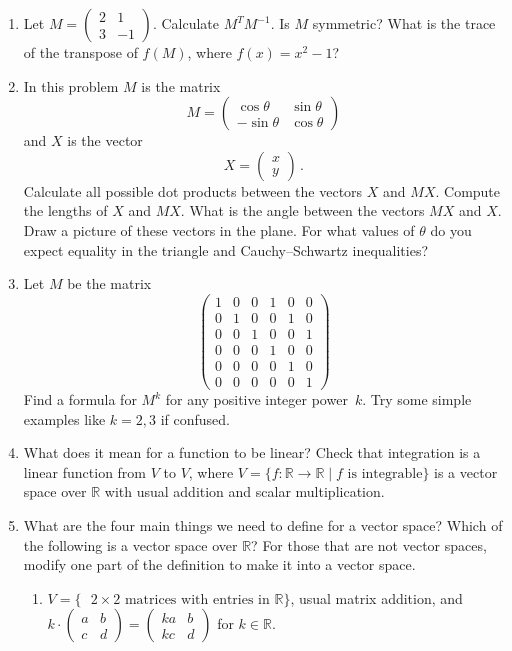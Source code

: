 \begin{enumerate}
\item Let $M = \left ( \begin{array}{cc} 2 & 1 \\ 3 & -1 \end{array}  \right )$.  Calculate $M^TM^{-1}$.  Is $M$ symmetric?  What is the trace of the transpose of $f(M)$, where $f(x) = x^2 -1$?

\item In this problem $M$ is the matrix
$$
M=\begin{pmatrix}\cos\theta & \sin\theta \\ -\sin\theta&\cos\theta\end{pmatrix}
$$
and $X$ is the vector
$$
X=\begin{pmatrix}x\\y \end{pmatrix}\, .
$$
Calculate all possible dot products between the vectors $X$ and $MX$. Compute the lengths of $X$ and $MX$.
What is the angle between the vectors $MX$ and $X$. Draw a picture of these vectors in the plane. For what values
of $\theta$ do you expect equality in the triangle and Cauchy--Schwartz inequalities?

\item Let $M$ be the matrix
$$
\begin{pmatrix}
1&0&0&1&0&0\\
0&1&0&0&1&0\\
0&0&1&0&0&1\\
0&0&0&1&0&0\\
0&0&0&0&1&0\\
0&0&0&0&0&1
\end{pmatrix}
$$
Find a formula for $M^k$ for any positive integer power~$k$. Try some simple examples like $k=2,3$ if confused.



\item What does it mean for a function to be linear?  Check that integration is a linear function from $V$ to $V$, where $V = \{ f: \mathbb{R} \to \mathbb{R} \mid f \textrm{ is integrable}\}$ is a vector space over $\mathbb{R}$ with usual addition and scalar multiplication.


\item What are the four main things we need to define for a vector space?  Which of the following is a vector space over $\mathbb{R}$?  For those that are not vector spaces, modify one part of the definition to make it into a vector space.
\begin{enumerate}
\item $V = \{ \textrm{ $2 \times 2$ matrices with entries in $\mathbb{R}$} \}$, usual matrix addition, and $k \cdot \left ( \begin{array}{cc} a & b \\ c & d \end{array}  \right ) = \left ( \begin{array}{cc} ka & b \\ kc & d \end{array}  \right )$ for $k \in \mathbb{R}$.


\end{enumerate}
\end{enumerate}
